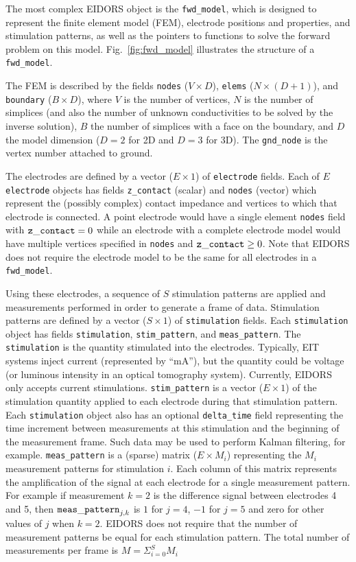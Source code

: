 \documentclass[12pt]{iopart}
\begin{document}
The most complex EIDORS object is the {\tt fwd\_model},
which is designed to represent the finite element model 
(FEM), electrode
positions and properties, and stimulation patterns, as
well as the pointers to functions to solve the forward
problem on this model. Fig.~\ref{fig:fwd_model} illustrates
the structure of a {\tt fwd\_model}.

The FEM is described by the fields
{\tt nodes} ($V{\times}D$),
{\tt elems} ($N{\times}(D+1)$), and
{\tt boundary} ($B{\times}D$), where
$V$ is the number of vertices, $N$ is the number of
simplices (and also the number of unknown conductivities
to be solved by the inverse solution), $B$ the number
of simplices with a face on the boundary, and $D$ the
model dimension ($D=2$ for 2D and $D=3$ for 3D).
The {\tt gnd\_node} is the vertex number attached to ground.

The electrodes are defined by a vector ($E\times1$) of
{\tt electrode} fields. Each of $E$ {\tt electrode}
objects has fields
{\tt z\_contact} (scalar) and {\tt nodes} (vector)
 which represent the
(possibly complex) contact impedance
and vertices to which that electrode is connected.
A point electrode would have a single element
{\tt nodes} field with ${\tt z\_contact}=0$ while
an electrode with a complete electrode model
would have multiple vertices specified in {\tt nodes}
and ${\tt z\_contact}\ge0$. Note that EIDORS
does not require the electrode model to be the same
for all electrodes in a {\tt fwd\_model}.

Using these electrodes, a sequence of $S$ stimulation
patterns are applied and measurements performed
in order to generate a frame of data.
Stimulation patterns are defined by a vector
($S\times1$) of {\tt stimulation} fields. Each
{\tt stimulation} object has fields
{\tt stimulation}, 
{\tt stim\_pattern}, and
{\tt meas\_pattern}. The {\tt stimulation} is
the quantity stimulated into the electrodes. Typically,
EIT systems inject current (represented by ``mA''),
but the quantity could be voltage (or luminous
intensity in an optical tomography system). Currently,
EIDORS only accepts current stimulations.
{\tt stim\_pattern} is a vector ($E\times1$)
of the stimulation quantity applied to each electrode
during that stimulation pattern.
Each {\tt stimulation} object also has an optional 
{\tt delta\_time} field representing the time increment
between measurements at this stimulation and the beginning
of the measurement frame. Such data may be used to perform
Kalman filtering, for example.
{\tt meas\_pattern} is a (sparse) matrix ($E{\times}M_i$) 
representing the $M_i$ measurement patterns for
stimulation $i$. Each column of this matrix represents
the amplification of the signal at each electrode for
a single measurement pattern. For example if measurement
$k=2$ is the difference signal between electrodes 4 and 5,
then ${\tt meas\_pattern}_{j,k}$ is $1$ for $j=4$,  $-1$
for $j=5$ and zero for other values of $j$ when $k=2$.
EIDORS does not require that the number of measurement
patterns be equal for each stimulation pattern. 
The total number of measurements per frame is
$ M = \Sigma_{i=0}^{S} M_i$
\end{document}
